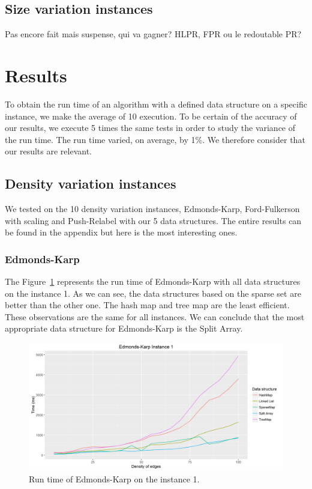 \subsection{Size variation instances}
Pas encore fait mais suspense, qui va gagner? HLPR, FPR ou le redoutable PR?

\section{Results}
To obtain the run time of an algorithm with a defined data structure on a specific instance, we make the average of 10 execution. To be certain of the accuracy of our results, we execute 5 times the same tests in order to study the variance of the run time. The run time varied, on average, by 1\%. We therefore consider that our results are relevant.

\subsection{Density variation instances}
We tested on the 10 density variation instances, Edmonds-Karp, Ford-Fulkerson with scaling and Push-Relabel with our 5 data structures. The entire results can be found in the appendix but here is the most interesting ones.

\subsubsection{Edmonds-Karp}
The Figure~\ref{fig:EK1} represents the run time of Edmonds-Karp with all data structures on the instance 1. As we can see, the data structures based on the sparse set are better than the other one. The hash map and tree map are the least efficient. These observations are the same for all instances. We can conclude that the most appropriate data structure for Edmonds-Karp is the Split Array.

\begin{figure}[H]
\includegraphics[scale=0.63]{images/EK1.png}
\caption{Run time of Edmonds-Karp on the instance 1.}
\label{fig:EK1}
\end{figure}

